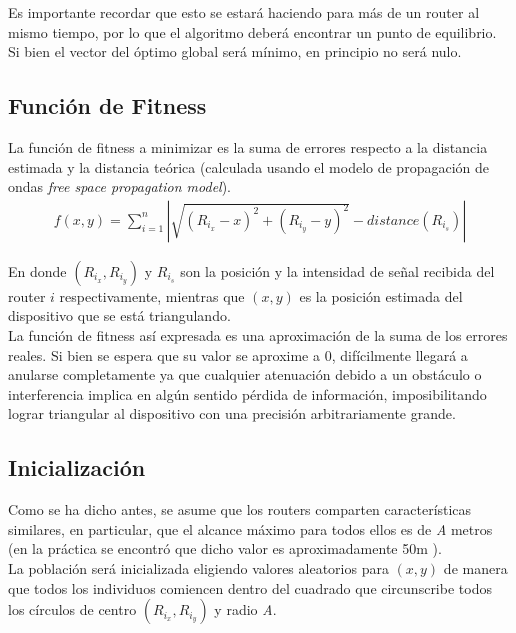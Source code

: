 \documentclass[journal]{IEEEtran}
\begin{document}
Es importante recordar que esto se estará haciendo para más de un router al mismo tiempo, por lo que el algoritmo deberá encontrar un punto de equilibrio. Si bien el vector del óptimo global será mínimo, en principio no será nulo.\\

\subsection{Función de Fitness}

La función de fitness a minimizar es la suma de errores respecto a la distancia estimada y la distancia teórica (calculada usando el modelo de propagación de ondas \emph{free space propagation model}).\\

\begin{equation*}
\begin{split}
f(x, y) = \sum_{i=1}^{n} |\sqrt{(R_{i_x}-x)^2 + (R_{i_y}-y)^2} - distance(R_{i_s})|
\end{split}
\end{equation*}

En donde $(R_{i_x},R_{i_y})$ y $R_{i_s}$ son la posición y la intensidad de señal recibida del router $i$ respectivamente, mientras que $(x,y)$ es la posición estimada del dispositivo que se está triangulando.\\

La función de fitness así expresada es una aproximación de la suma de los errores reales. Si bien se espera que su valor se aproxime a 0, difícilmente llegará a anularse completamente ya que cualquier atenuación debido a un obstáculo o interferencia implica en algún sentido pérdida de información, imposibilitando lograr triangular al dispositivo con una precisión arbitrariamente grande.

\subsection{Inicialización}

Como se ha dicho antes, se asume que los routers comparten características similares, en particular, que el alcance máximo para todos ellos es de \textit{A} metros (en la práctica se encontró que dicho valor es aproximadamente 50m \cite{routers:range}).\\

La población será inicializada eligiendo valores aleatorios para $(x,y)$ de manera que todos los individuos comiencen dentro del cuadrado que circunscribe todos los círculos de centro $(R_{i_x}, R_{i_y})$ y radio \textit{A}.\\
\end{document}
